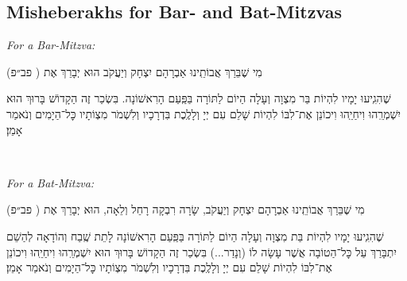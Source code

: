 \documentclass[11pt, openany]{article}
\newcommand{\englishinst}[1]{
	\begin{minipage}{\textwidth}
		\begin{english}\raggedright\centering
			\textit{#1}
				
				\vspace{2pt}
		\end{english}
	\end{minipage}
}
\newcommand{\rashi}[1]{%
		\textsf{#1}}
\newcommand{\eng}[1]{\begin{english}\beginL #1 \endL\end{english}}
\newcommand{\ploni}{(\rashi{פב״פ})
}
\begin{document}
\begin{minipage}{\textwidth}
\eng{\section*{Misheberakhs for Bar- and Bat-Mitzvas}}

\englishinst{For a Bar-Mitzva:}
\begin{large}
מִי שֶׁבֵּרַךְ אֲבוֹתֵֽינוּ אַבְרָהָם יִצְחָק וְיַעֲקֹב הוּא יְבָרֵךְ אֶת
\ploni
שֶׁהִגִֽיעוּ יָמָיו לִהְיוֹת בַּר מִצְוָה וְעָלָה הַיוֹם לַתּוֹרָה בַּפַּֽעַם הָרִאשׁוֹנָה. בִּשְׂכַר זֶה הַקָדוֹשׁ בָּרוּךְ הוּא יִשְׁמְרֵֽהוּ וִיחַיֵֽהוּ וִיכוֹנֵן אֶת־לִבּוֹ לִהְיוֹת שָׁלֵם עִם יְיָ וְלָלֶֽכֶת בִּדְרָכָיו וְלִשְׁמֹר מִצְוֹתָיו כׇּל־הַיָמִים וְנֹאמַר אָמֵן׃\end{large}\\

\englishinst{For a Bat-Mitzva:}
\begin{large}
מִי שֶׁבֵּרַךְ אֲבוֹתֵֽינוּ אַבְרָהָם יִצְחָק וְיַעֲקֹב, שָׂרָה רִבְקָה רָחֵל וְלֵאָה, הוּא יְבָרֵךְ אֶת
\ploni
שֶׁהִגִֽיעוּ יָמָיו לִהְיוֹת בַּת מִצְוָה וְעָלָה הַיוֹם לַתּוֹרָה בַּפַּֽעַם הָרִאשׁוֹנָה לָתֵת שֶֽׁבַח וְהוֹדָאָה לְהַשֵׁם יִתְבָּרַךְ עַל כׇּל־הַטוֹבָה אֲשֶׁר עָשָׂה לוֹ (וְנָדַר...) בִּשְׂכַר זֶה הַקָדוֹשׁ בָּרוּךְ הוּא יִשְׁמְרֵֽהוּ וִיחַיֵֽהוּ וִיכוֹנֵן אֶת־לִבּוֹ לִהְיוֹת שָׁלֵם עִם יְיָ וְלָלֶֽכֶת בִּדְרָכָיו וְלִשְׁמֹר מִצְוֹתָיו כׇּל־הַיָמִים וְנֹאמַר אָמֵן׃\end{large}\end{minipage}
\end{document}
